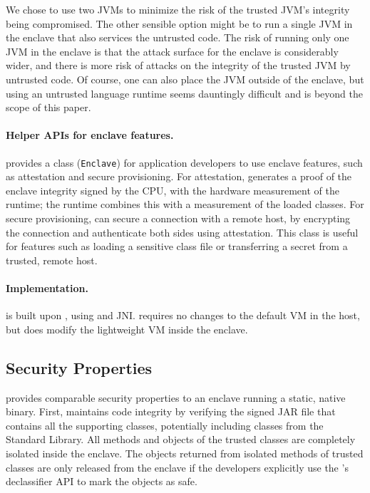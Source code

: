 We chose to use two JVMs to minimize the risk of the trusted JVM's integrity 
being compromised.  The other sensible option might be to 
run a single JVM in the enclave that also services the untrusted code.
The risk of running only one JVM in the enclave is that the attack surface for the enclave is considerably
wider, and there is more risk of attacks on the integrity of the trusted JVM by untrusted code.
Of course, one can also place the JVM outside of the enclave, but using an untrusted language runtime
seems dauntingly difficult and is beyond the scope of this paper.



\paragraph{Helper APIs for enclave features.}
\systemname{} provides a \java{} class ({\tt Enclave}) for application developers
to use enclave features, such as attestation and secure provisioning.
For attestation, \systemname{} generates a proof of the enclave integrity signed by the CPU,
with the hardware measurement of the \systemname{} runtime;
the \systemname{} runtime combines this with a measurement of the loaded classes.
For secure provisioning,
\systemname{} can secure a connection with a remote host,
by encrypting the connection and authenticate both sides using attestation.
This class is useful for features such as loading a sensitive class file or transferring
a secret 
from a trusted, remote host.

\paragraph{Implementation.} \systemname{} is built upon \jvm{}, using \java{} and JNI.
\systemname{} requires no changes to the default \java{} VM in the host,
but does modify the lightweight \java{} VM inside the enclave.

\subsection{Security Properties}

\systemname{} provides comparable security properties to an enclave running a static, native binary.
First, \systemname{} maintains code integrity by verifying the signed JAR file that contains all the supporting classes, potentially including classes from the \java{} Standard Library.
All methods and objects of the trusted classes are completely isolated 
inside the \sgx{} enclave.
The objects returned from isolated methods of trusted classes are only released
from the enclave if the developers explicitly use the \systemname{}'s declassifier API to mark the objects as safe.

